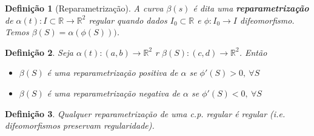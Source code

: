 \documentclass[12pt]{article}
\newtheorem{definition}{Definição}
\begin{document}
\begin{definition}[Reparametrização]
A curva $\beta(s)$ é dita uma \textbf{reparametrização} de $\alpha(t): I \subset \mathbb{R} \rightarrow \mathbb{R}^2$ regular quando dados $I_0 \subset \mathbb{R}$ e $\phi: I_0 \rightarrow I$ difeomorfismo. Temos $\beta(S) = \alpha(\phi(S)))$.
\end{definition}

\begin{definition}
Seja $\alpha(t): (a, b) \rightarrow \mathbb{R}^2$ r $\beta(S): (c, d) \rightarrow \mathbb{R}^2$. Então

\begin{itemize}
    \item $\beta(S)$ é uma reparametrização positiva de $\alpha$ se $\phi'(S) > 0,\ \forall S$
    \item $\beta(S)$ é uma reparametrização negativa de $\alpha$ se $\phi'(S) < 0,\ \forall S$
\end{itemize}
\end{definition}

\begin{definition}
Qualquer reparametrização de uma c.p. regular é regular (i.e. difeomorfismos preservam regularidade).
\end{definition}
\end{document}
